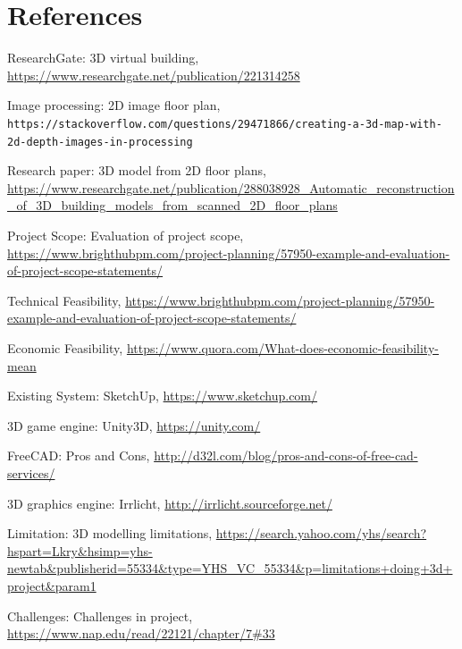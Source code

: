 \documentclass{article}
\begin{document}
\pagebreak
\section{References}
\begin{thebibliography}{9}

ResearchGate: 3D virtual building,
\url{https://www.researchgate.net/publication/221314258}

 
Image processing: 2D image floor plan,
\\\texttt{https://stackoverflow.com/questions/29471866/creating-a-3d-map-with-2d-depth-images-in-processing}

Research paper: 3D model from 2D floor plans,
\url{https://www.researchgate.net/publication/288038928_Automatic_reconstruction_of_3D_building_models_from_scanned_2D_floor_plans}

Project Scope: Evaluation of project scope,
\url{https://www.brighthubpm.com/project-planning/57950-example-and-evaluation-of-project-scope-statements/}

Technical Feasibility,
\url{https://www.brighthubpm.com/project-planning/57950-example-and-evaluation-of-project-scope-statements/}

Economic Feasibility,
\url{https://www.quora.com/What-does-economic-feasibility-mean}

Existing System: SketchUp,
\url{https://www.sketchup.com/}

3D game engine: Unity3D,
\url{https://unity.com/}


FreeCAD: Pros and Cons,
\url{http://d32l.com/blog/pros-and-cons-of-free-cad-services/}

3D graphics engine: Irrlicht,
\url{http://irrlicht.sourceforge.net/}

Limitation: 3D modelling limitations,
\url{https://search.yahoo.com/yhs/search?hspart=Lkry&hsimp=yhs-newtab&publisherid=55334&type=YHS_VC_55334&p=limitations+doing+3d+project&param1}

Challenges: Challenges in project,
\url{https://www.nap.edu/read/22121/chapter/7#33}
\end{thebibliography}
\end{document}
